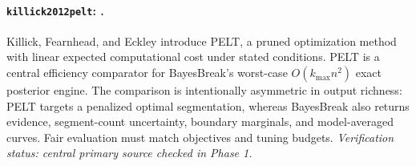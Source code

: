 
\paragraph{\texttt{killick2012pelt}: \citet{killick2012pelt}.}
Killick, Fearnhead, and Eckley introduce PELT, a pruned optimization method with linear expected computational cost under stated conditions. PELT is a central efficiency comparator for BayesBreak's worst-case $O(k_{\max}n^2)$ exact posterior engine. The comparison is intentionally asymmetric in output richness: PELT targets a penalized optimal segmentation, whereas BayesBreak also returns evidence, segment-count uncertainty, boundary marginals, and model-averaged curves. Fair evaluation must match objectives and tuning budgets. \textit{Verification status: central primary source checked in Phase 1.}
